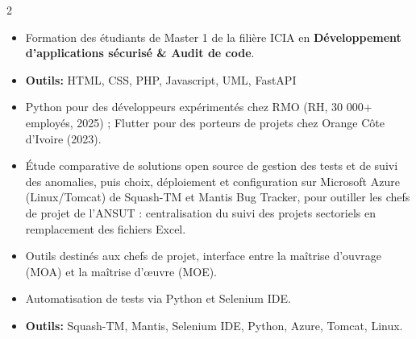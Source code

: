 \documentclass[10pt,a4paper,ragged2e,withhyper]{altacv}
\begin{document}
\begin{paracol}{2}
            \begin{itemize}
                \item Formation des étudiants de Master 1 de la filière ICIA en {\textbf{Développement d'applications sécurisé \& Audit de code}}.
                \item \textcolor{SecondaryColor}{\textbf{Outils: }} HTML, CSS, PHP, Javascript, UML, FastAPI
            \end{itemize}
            \divider

            \begin{itemize}
                \item Python pour des développeurs expérimentés chez RMO (RH, 30 000+ employés, 2025) ; Flutter pour des porteurs de projets chez Orange Côte d'Ivoire (2023).
            \end{itemize}

        \divider

        \begin{itemize}
            \item Étude comparative de solutions open source de gestion des tests et de suivi des anomalies, puis choix, déploiement et configuration sur Microsoft Azure (Linux/Tomcat) de Squash-TM et Mantis Bug Tracker, pour outiller les chefs de projet de l'ANSUT : centralisation du suivi des projets sectoriels en remplacement des fichiers Excel.
            \item Outils destinés aux chefs de projet, interface entre la maîtrise d'ouvrage (MOA) et la maîtrise d'œuvre (MOE).
            \item Automatisation de tests via Python et Selenium IDE.
            \item \textcolor{SecondaryColor}{\textbf{Outils: }} Squash-TM, Mantis, Selenium IDE, Python, Azure, Tomcat, Linux.
        \end{itemize}


\end{paracol}
\end{document}
